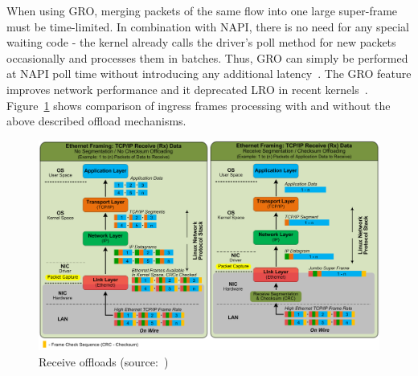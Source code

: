 When using GRO, merging packets of the same flow into one large super-frame must be time-limited.
In combination with NAPI, there is no need for any special waiting code -
the kernel already calls the driver's poll method for new packets occasionally and processes them in batches.
Thus, GRO can simply be performed at NAPI poll time without introducing any additional latency~\cite{jls2009-gro}.
The GRO feature improves network performance
and it deprecated LRO in recent kernels~\cite{linux-kernel-networking}.
Figure~\ref{fig:linux-rcv-offloads} shows comparison of ingress frames processing
with and without the above described offload mechanisms.

\begin{figure}
	\centering
	\includegraphics[width=15cm,keepaspectratio]{fig/rcv-offloads.png}
	\caption{Receive offloads (source:~\cite{nst-offloads})}
	\label{fig:linux-rcv-offloads}
	\bigskip
\end{figure}
